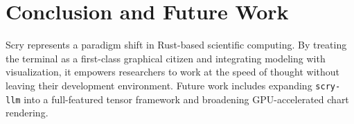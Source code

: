 \documentclass[11pt,twocolumn]{article}
\begin{document}
\section{Conclusion and Future Work}
Scry represents a paradigm shift in Rust-based scientific computing. By treating the terminal as a first-class graphical citizen and integrating modeling with visualization, it empowers researchers to work at the speed of thought without leaving their development environment. Future work includes expanding \texttt{scry-llm} into a full-featured tensor framework and broadening GPU-accelerated chart rendering.
\end{document}
